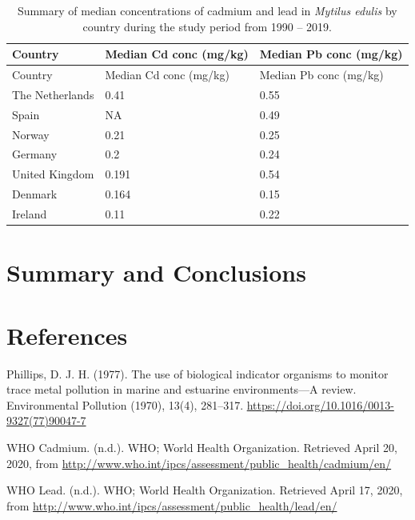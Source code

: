 \documentclass[
  12pt,
]{article}
\begin{document}
\begin{longtable}[]{@{}lll@{}}
\caption{Summary of median concentrations of cadmium and lead in
\emph{Mytilus edulis} by country during the study period from 1990 --
2019.}\tabularnewline
\toprule
Country & Median Cd conc (mg/kg) & Median Pb conc (mg/kg)\tabularnewline
\midrule
\endfirsthead
\toprule
Country & Median Cd conc (mg/kg) & Median Pb conc (mg/kg)\tabularnewline
\midrule
\endhead
The Netherlands & 0.41 & 0.55\tabularnewline
Spain & NA & 0.49\tabularnewline
Norway & 0.21 & 0.25\tabularnewline
Germany & 0.2 & 0.24\tabularnewline
United Kingdom & 0.191 & 0.54\tabularnewline
Denmark & 0.164 & 0.15\tabularnewline
Ireland & 0.11 & 0.22\tabularnewline
\bottomrule
\end{longtable}

\newpage

\hypertarget{summary-and-conclusions}{%
\section{Summary and Conclusions}\label{summary-and-conclusions}}

\newpage

\hypertarget{references}{%
\section{References}\label{references}}

Phillips, D. J. H. (1977). The use of biological indicator organisms to
monitor trace metal pollution in marine and estuarine environments---A
review. Environmental Pollution (1970), 13(4), 281--317.
\url{https://doi.org/10.1016/0013-9327(77)90047-7}

WHO \textbar{} Cadmium. (n.d.). WHO; World Health Organization.
Retrieved April 20, 2020, from
\url{http://www.who.int/ipcs/assessment/public_health/cadmium/en/}

WHO \textbar{} Lead. (n.d.). WHO; World Health Organization. Retrieved
April 17, 2020, from
\url{http://www.who.int/ipcs/assessment/public_health/lead/en/}
\end{document}
